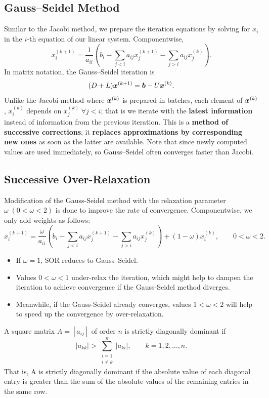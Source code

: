 \subsection{Gauss--Seidel Method}
Similar to the Jacobi method, we prepare the iteration equations by solving for $x_i$ in the $i$-th equation of our linear system. Componentwise,
\[
 x_i^{(k+1)}=\frac{1}{a_{ii}}
 \left(
 b_i-\sum_{j<i}a_{ij}x_j^{(k+1)}
     -\sum_{j>i}a_{ij}x_j^{(k)}
 \right).
\]
In matrix notation, the Gauss--Seidel iteration is
\[
 (D+L)\boldsymbol{x}^{(k+1)}
 =\boldsymbol{b}-U\boldsymbol{x}^{(k)}.
\]
Unlike the Jacobi method where $\boldsymbol{x}^{(k)}$ is prepared in batches, each element of $\boldsymbol{x}^{(k)}$, $x^{(k)}_i$ depends on $x^{(k)}_j \; \forall j<i$; that is we iterate with the \textbf{latest information} instead of information from the previous iteration. 
This is a \textbf{method of successive corrections}; it \textbf{replaces approximations by corresponding new ones} as soon as the latter are available.
Note that since newly computed values are used immediately, so Gauss--Seidel often converges faster than Jacobi.

\subsection{Successive Over-Relaxation}
Modification of the Gauss-Seidel method with the relaxation parameter $\omega \; (0<\omega<2)$ is done to improve the rate of convergence. Componentwise, we only add weights as follows:
\[
 x_i^{(k+1)}
 =
 \frac{\omega}{a_{ii}}
 \left(
 b_i-\sum_{j<i}a_{ij}x_j^{(k+1)}
     -\sum_{j>i}a_{ij}x_j^{(k)}
 \right)+(1-\omega)x_i^{(k)},
\qquad 0<\omega<2.
\]
\begin{itemize}
\item If $\omega=1$, SOR reduces to Gauss--Seidel.
\item Values $0<\omega<1$ under-relax the iteration, which might help to dampen the iteration to achieve convergence if the Gauss-Seidel method diverges.
\item Meanwhile, if the Gauss-Seidel already converges, values $1<\omega<2$ will help to speed up the convergence by over-relaxation.
\end{itemize}

\begin{definition}
A square matrix $A=[a_{ij}]$ of order $n$ is strictly diagonally dominant if
\[
 |a_{kk}| >\sum_{\substack{i=1\\ i\ne k}}^{n}|a_{ki}|,
 \qquad k=1,2,\ldots,n.
\]
That is, A is strictly diagonally dominant if the absolute value of each diagonal entry is greater than the sum of the absolute values of the remaining entries in the same row.
\end{definition}

